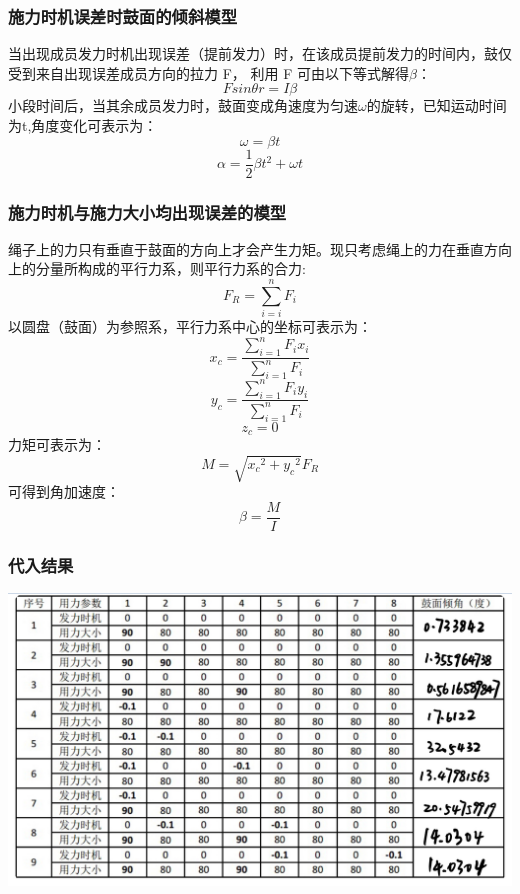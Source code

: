 \documentclass[withoutpreface,bwprint]{cumcmthesis}
\begin{document}
\subsubsection{施力时机误差时鼓面的倾斜模型}
当出现成员发力时机出现误差（提前发力）时，在该成员提前发力的时间内，鼓仅受到来自出现误差成员方向的拉力 F，
利用 F 可由以下等式解得$\beta$：
\[Fsin\theta{r} = I\beta\]
小段时间后，当其余成员发力时，鼓面变成角速度为匀速$\omega$的旋转，已知运动时间为t,角度变化可表示为：
\[\omega = \beta{t}\]
\[\alpha = \frac{1}{2}\beta{t^2} + \omega{t}\]

\subsubsection{施力时机与施力大小均出现误差的模型}
绳子上的力只有垂直于鼓面的方向上才会产生力矩。现只考虑绳上的力在垂直方向上的分量所构成的平行力系，则平行力系的合力: 
\[F_R = \sum_{i = i}^nF_i\]
以圆盘（鼓面）为参照系，平行力系中心的坐标可表示为：
\[x_c = \frac{\sum_{i=1}^nF_ix_i}{\sum_{i = 1}^nF_i}\]
\[y_c = \frac{\sum_{i=1}^nF_iy_i}{\sum_{i = 1}^nF_i}\]
\[z_c = 0\]
力矩可表示为：
\[M = \sqrt{{x_c}^2 + {y_c}^2}F_R\]
可得到角加速度：
\[\beta = \frac{M}{I}\]
\subsubsection{代入结果}
\includegraphics[scale = 0.33]{IMG_31CE30BB597B-1.jpeg}
\end{document}
